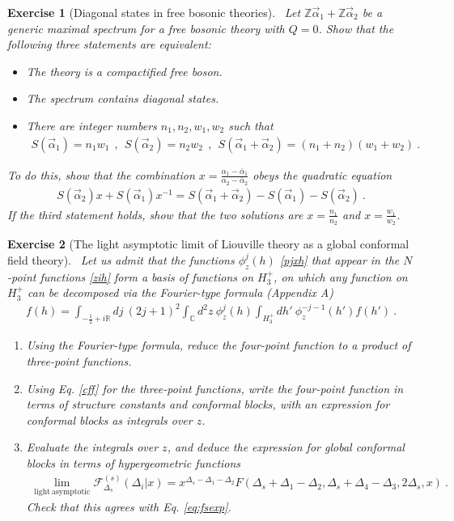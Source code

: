 \documentclass[12pt, a4paper, notitlepage, twoside]{report}
\numberwithin{equation}{section}
\theoremstyle{break}
\newtheorem{exo}{Exercise}[chapter]
\begin{document}
\begin{exo}[Diagonal states in free bosonic theories]
 ~\label{exofbd}
 Let $\mathbb{Z}\vec\alpha_1+\mathbb{Z}\vec\alpha_2$ be a generic maximal spectrum for a free bosonic theory with $Q=0$.
 Show that the following three statements are equivalent:
 \begin{itemize}
  \item The theory is a compactified free boson.
  \item The spectrum contains diagonal states.
  \item There are integer numbers $n_1,n_2,w_1,w_2$ such that 
  \begin{align}
  S(\vec\alpha_1)=n_1w_1 \ \ , \ \  S(\vec\alpha_2)=n_2w_2\ \ ,\ \  S(\vec\alpha_1+\vec\alpha_2) = (n_1+n_2)(w_1+w_2)\ .
  \end{align}
 \end{itemize}
To do this, show that the combination $x=\frac{\alpha_1-\bar{\alpha}_1}{\alpha_2-\bar{\alpha}_2}$ obeys the quadratic equation 
\begin{align}
S(\vec\alpha_2)x+ S(\vec\alpha_1)x^{-1} = S(\vec\alpha_1+\vec\alpha_2) -S(\vec\alpha_1)-  S(\vec\alpha_2)\ .
\end{align}
If the third statement holds, show that the two solutions are $x=\frac{n_1}{n_2}$ and $x=\frac{w_1}{w_2}$.
\end{exo}

\begin{exo}[The light asymptotic limit of Liouville theory as a global conformal field theory]
 ~\label{exolight}
 Let us admit that the functions $\phi^j_z(h)$ \eqref{pjxh} that appear in the $N$-point functions \eqref{zih} form a basis of functions on $H_3^+$, on which any function on $H_3^+$ can be decomposed via the Fourier-type formula \cite{tes97b}(Appendix A) 
 \begin{align}
 f(h)=  \int_{-\frac12+i\mathbb{R}} dj\ (2j+1)^2\int_\mathbb{C} d^2z\ \phi^j_z(h)\int_{H_3^+} dh'\ \phi^{-j-1}_z(h')f(h')\ .
 \end{align}
\begin{enumerate}
 \item Using the Fourier-type formula, reduce the four-point function to a product of three-point functions.
 \item Using Eq. \eqref{cff} for the three-point functions, write the four-point function in terms of structure constants and conformal blocks, with an expression for conformal blocks as integrals over $z$.
 \item Evaluate the integrals over $z$, and deduce the expression for global conformal blocks in terms of hypergeometric functions 
 \begin{align}
  \lim_{\mathrm{light\ asymptotic}} \mathcal{F}^{(s)}_{\Delta_s}(\Delta_i|x) = x^{\Delta_s-\Delta_1-\Delta_2} F(\Delta_s+\Delta_1-\Delta_2,\Delta_s+\Delta_4-\Delta_3,2\Delta_s,x)\ .
 \end{align}
 Check that this agrees with Eq. \eqref{eq:fsexp}.
\end{enumerate}
\end{exo}
\end{document}
